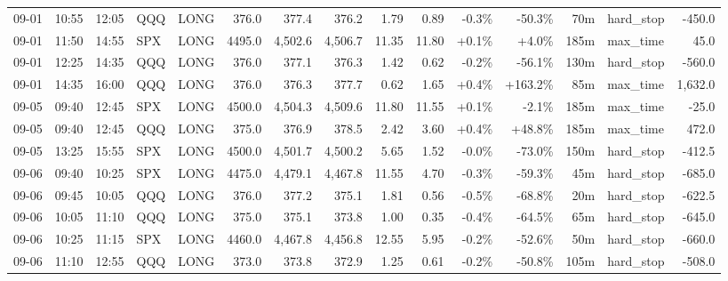 \documentclass[11pt,a4paper,twoside]{article}
\begin{document}
\begin{landscape}
\begin{center}
\begin{longtable}{>{\color{txtmain}}l l l l l r r r r r r r r >{\color{txtmain}}l r}
09-01 & 10:55 & 12:05 & QQQ & LONG & 376.0 & 377.4 & 376.2 & 1.79 & 0.89 & \textcolor{lossred}{-0.3\%} & \textcolor{lossred}{-50.3\%} & 70m & hard\_stop & \textcolor{lossred}{-450.0} \\
09-01 & 11:50 & 14:55 & SPX & LONG & 4495.0 & 4,502.6 & 4,506.7 & 11.35 & 11.80 & \textcolor{wingreen}{+0.1\%} & \textcolor{wingreen}{+4.0\%} & 185m & max\_time & \textcolor{wingreen}{45.0} \\
09-01 & 12:25 & 14:35 & QQQ & LONG & 376.0 & 377.1 & 376.3 & 1.42 & 0.62 & \textcolor{lossred}{-0.2\%} & \textcolor{lossred}{-56.1\%} & 130m & hard\_stop & \textcolor{lossred}{-560.0} \\
09-01 & 14:35 & 16:00 & QQQ & LONG & 376.0 & 376.3 & 377.7 & 0.62 & 1.65 & \textcolor{wingreen}{+0.4\%} & \textcolor{wingreen}{+163.2\%} & 85m & max\_time & \textcolor{wingreen}{1,632.0} \\
09-05 & 09:40 & 12:45 & SPX & LONG & 4500.0 & 4,504.3 & 4,509.6 & 11.80 & 11.55 & \textcolor{wingreen}{+0.1\%} & \textcolor{lossred}{-2.1\%} & 185m & max\_time & \textcolor{lossred}{-25.0} \\
09-05 & 09:40 & 12:45 & QQQ & LONG & 375.0 & 376.9 & 378.5 & 2.42 & 3.60 & \textcolor{wingreen}{+0.4\%} & \textcolor{wingreen}{+48.8\%} & 185m & max\_time & \textcolor{wingreen}{472.0} \\
09-05 & 13:25 & 15:55 & SPX & LONG & 4500.0 & 4,501.7 & 4,500.2 & 5.65 & 1.52 & \textcolor{lossred}{-0.0\%} & \textcolor{lossred}{-73.0\%} & 150m & hard\_stop & \textcolor{lossred}{-412.5} \\
09-06 & 09:40 & 10:25 & SPX & LONG & 4475.0 & 4,479.1 & 4,467.8 & 11.55 & 4.70 & \textcolor{lossred}{-0.3\%} & \textcolor{lossred}{-59.3\%} & 45m & hard\_stop & \textcolor{lossred}{-685.0} \\
09-06 & 09:45 & 10:05 & QQQ & LONG & 376.0 & 377.2 & 375.1 & 1.81 & 0.56 & \textcolor{lossred}{-0.5\%} & \textcolor{lossred}{-68.8\%} & 20m & hard\_stop & \textcolor{lossred}{-622.5} \\
09-06 & 10:05 & 11:10 & QQQ & LONG & 375.0 & 375.1 & 373.8 & 1.00 & 0.35 & \textcolor{lossred}{-0.4\%} & \textcolor{lossred}{-64.5\%} & 65m & hard\_stop & \textcolor{lossred}{-645.0} \\
09-06 & 10:25 & 11:15 & SPX & LONG & 4460.0 & 4,467.8 & 4,456.8 & 12.55 & 5.95 & \textcolor{lossred}{-0.2\%} & \textcolor{lossred}{-52.6\%} & 50m & hard\_stop & \textcolor{lossred}{-660.0} \\
09-06 & 11:10 & 12:55 & QQQ & LONG & 373.0 & 373.8 & 372.9 & 1.25 & 0.61 & \textcolor{lossred}{-0.2\%} & \textcolor{lossred}{-50.8\%} & 105m & hard\_stop & \textcolor{lossred}{-508.0} \\

\end{longtable}
\end{center}
\end{landscape}
\end{document}
